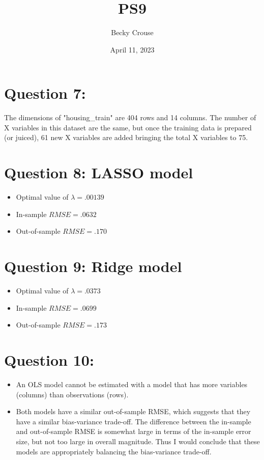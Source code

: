 \documentclass[nobib]{MSword}
\title{PS9}
\author{Becky Crouse}
\date{April 11, 2023}
\begin{document}
\maketitle

\section*{Question 7:}
The dimensions of "housing\_train" are 404 rows and 14 columns. The number of X variables in this dataset are the same, but once the training data is prepared (or juiced), 61 new X variables are added bringing the total X variables to 75. 

\section*{Question 8: LASSO model}

\begin{itemize}
    \item Optimal value of $\lambda=.00139$ 
    \item In-sample $RMSE=.0632$
    \item Out-of-sample $RMSE=.170$
\end{itemize}

\section*{Question 9: Ridge model}

\begin{itemize}
    \item Optimal value of $\lambda=.0373$ 
    \item In-sample $RMSE=.0699$
    \item Out-of-sample $RMSE=.173$
\end{itemize}

\section*{Question 10:}
\begin{itemize}
    \item An OLS model cannot be estimated with a model that has more variables (columns) than observations (rows).
    \item Both models have a similar out-of-sample RMSE, which suggests that they have a similar bias-variance trade-off. The difference between the in-sample and out-of-sample RMSE is somewhat large in terms of the in-sample error size, but not too large in overall magnitude. Thus I would conclude that these models are appropriately balancing the bias-variance trade-off.
\end{itemize}
\end{document}
